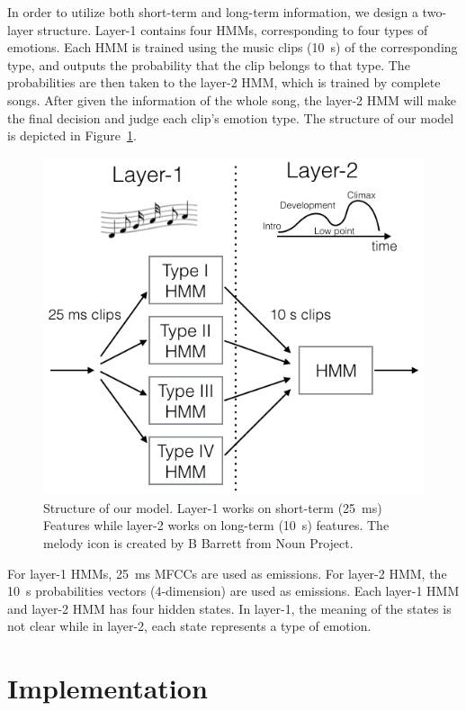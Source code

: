 \documentclass{IEEEtran}
\begin{document}
  In order to utilize both short-term and long-term information, we design a
  two-layer structure. Layer-1 contains four HMMs, corresponding to four types
  of emotions. Each HMM is trained using the music clips (10~s) of the
  corresponding type, and outputs the probability that the clip belongs to that
  type. The probabilities are then taken to the layer-2 HMM, which is trained
  by complete songs. After given the information of the whole song, the
  layer-2 HMM will make the final decision and judge each clip's emotion type.
  The structure of our model is depicted in Figure~\ref{fig:structure}.

  \begin{figure}[htbp]
    \centering
    \includegraphics[width=\columnwidth]{structure.png}
    \caption{Structure of our model. Layer-1 works on short-term (25~ms)
    Features while layer-2 works on long-term (10~s) features. The melody icon
    is created by B Barrett from Noun Project.}
    \label{fig:structure}
  \end{figure}

  For layer-1 HMMs, 25~ms MFCCs are used as emissions. For layer-2 HMM, the
  10~s probabilities vectors (4-dimension) are used as emissions. Each layer-1
  HMM and layer-2 HMM has four hidden states. In layer-1, the meaning of the
  states is not clear while in layer-2, each state represents a type of
  emotion.

  \section{Implementation}
  \label{sec:Implementation}
\end{document}
